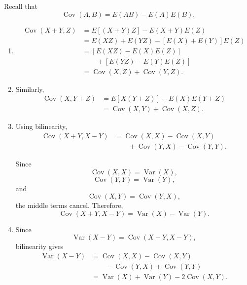 \documentclass[11pt]{article}
\newenvironment{solution}{
    \par
    \begin{tcolorbox}[
        colback=white,
        colframe=uwgold,
        boxrule=0.7pt,
        arc=2mm,
        left=3mm,
        right=3mm,
        top=2mm,
        bottom=2mm,
        breakable,
        before skip=0.5em,
        after skip=1em,
        title=\textbf{Solution},
        coltitle=uwpurple,
        fonttitle=\bfseries
    ]
}{
    \end{tcolorbox}
}
\begin{document}
\begin{solution}

Recall that
\[
\operatorname{Cov}(A,B)
=
E(AB)-E(A)E(B).
\]

\begin{enumerate}[label=(\alph*)]

\item
\[
\begin{aligned}
\operatorname{Cov}(X+Y,Z)
&=
E[(X+Y)Z]
-
E(X+Y)E(Z)\\
&=
E(XZ)+E(YZ)
-
[E(X)+E(Y)]E(Z)\\
&=
[E(XZ)-E(X)E(Z)]\\
&\qquad+
[E(YZ)-E(Y)E(Z)]\\
&=
\operatorname{Cov}(X,Z)
+
\operatorname{Cov}(Y,Z).
\end{aligned}
\]

\item Similarly,
\[
\begin{aligned}
\operatorname{Cov}(X,Y+Z)
&=
E[X(Y+Z)]
-
E(X)E(Y+Z)\\
&=
\operatorname{Cov}(X,Y)
+
\operatorname{Cov}(X,Z).
\end{aligned}
\]

\item Using bilinearity,
\[
\begin{aligned}
\operatorname{Cov}(X+Y,X-Y)
&=
\operatorname{Cov}(X,X)
-
\operatorname{Cov}(X,Y)\\
&\qquad+
\operatorname{Cov}(Y,X)
-
\operatorname{Cov}(Y,Y).
\end{aligned}
\]

Since
\[
\operatorname{Cov}(X,X)=\operatorname{Var}(X),
\]
\[
\operatorname{Cov}(Y,Y)=\operatorname{Var}(Y),
\]
and
\[
\operatorname{Cov}(X,Y)=\operatorname{Cov}(Y,X),
\]
the middle terms cancel. Therefore,
\[
\operatorname{Cov}(X+Y,X-Y)
=
\operatorname{Var}(X)-\operatorname{Var}(Y).
\]

\item Since
\[
\operatorname{Var}(X-Y)
=
\operatorname{Cov}(X-Y,X-Y),
\]
bilinearity gives
\[
\begin{aligned}
\operatorname{Var}(X-Y)
&=
\operatorname{Cov}(X,X)
-
\operatorname{Cov}(X,Y)\\
&\qquad
-
\operatorname{Cov}(Y,X)
+
\operatorname{Cov}(Y,Y)\\
&=
\operatorname{Var}(X)
+
\operatorname{Var}(Y)
-
2\operatorname{Cov}(X,Y).
\end{aligned}
\]

\end{enumerate}

\end{solution}
\end{document}
